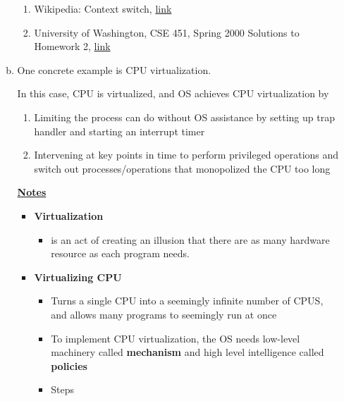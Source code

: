 \documentclass[12pt]{article}
\begin{document}
\begin{enumerate}[1.]
\begin{enumerate}[a)]
        \begin{enumerate}[1)]
            \item Wikipedia: Context switch, \href{https://en.wikipedia.org/wiki/Context_switch}{link}
            \item University of Washington, CSE 451, Spring 2000 Solutions to Homework 2, \href{https://courses.cs.washington.edu/courses/cse451/00sp/homeworks/hw2soln.txt}{link}
        \end{enumerate}

        \item

        \bigskip

        One concrete example is CPU virtualization.

        \bigskip

        In this case, CPU is virtualized, and OS achieves CPU virtualization by

        \bigskip

        \begin{enumerate}[1)]
            \item Limiting the process can do without OS assistance by setting up trap handler and starting an interrupt timer
            \item Intervening at key points in time to perform privileged operations and
            switch out processes/operations that monopolized the CPU too long
        \end{enumerate}

        \bigskip

        \underline{\textbf{Notes}}

        \begin{itemize}
            \item \textbf{Virtualization}

            \begin{itemize}
                \item is an act of creating an illusion that there are as many hardware resource as each program needs.
            \end{itemize}

            \item \textbf{Virtualizing CPU}

            \begin{itemize}
                \item Turns a single CPU into a seemingly infinite number of CPUS, and
                allows many programs to seemingly run at once
                \item To implement CPU virtualization, the OS needs low-level machinery
                called \textbf{mechanism} and high level intelligence called \textbf{policies}
                \item Steps


\end{itemize}
\end{itemize}
\end{enumerate}
\end{enumerate}
\end{document}
